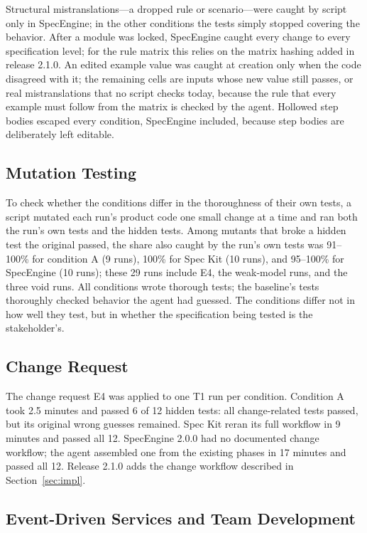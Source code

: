 \documentclass[conference]{IEEEtran}
\begin{document}
Structural mistranslations---a dropped rule or scenario---were caught by script only in SpecEngine; in the other conditions the tests simply stopped covering the behavior. After a module was locked, SpecEngine caught every change to every specification level; for the rule matrix this relies on the matrix hashing added in release 2.1.0. An edited example value was caught at creation only when the code disagreed with it; the remaining cells are inputs whose new value still passes, or real mistranslations that no script checks today, because the rule that every example must follow from the matrix is checked by the agent. Hollowed step bodies escaped every condition, SpecEngine included, because step bodies are deliberately left editable.

\subsection{Mutation Testing}

To check whether the conditions differ in the thoroughness of their own tests, a script mutated each run's product code one small change at a time and ran both the run's own tests and the hidden tests. Among mutants that broke a hidden test the original passed, the share also caught by the run's own tests was 91--100\% for condition A (9 runs), 100\% for Spec Kit (10 runs), and 95--100\% for SpecEngine (10 runs); these 29 runs include E4, the weak-model runs, and the three void runs. All conditions wrote thorough tests; the baseline's tests thoroughly checked behavior the agent had guessed. The conditions differ not in how well they test, but in whether the specification being tested is the stakeholder's.

\subsection{Change Request}

The change request E4 was applied to one T1 run per condition. Condition A took 2.5 minutes and passed 6 of 12 hidden tests: all change-related tests passed, but its original wrong guesses remained. Spec Kit reran its full workflow in 9 minutes and passed all 12. SpecEngine 2.0.0 had no documented change workflow; the agent assembled one from the existing phases in 17 minutes and passed all 12. Release 2.1.0 adds the change workflow described in Section~\ref{sec:impl}.

\subsection{Event-Driven Services and Team Development}\label{sec:eval-t4}
\end{document}
